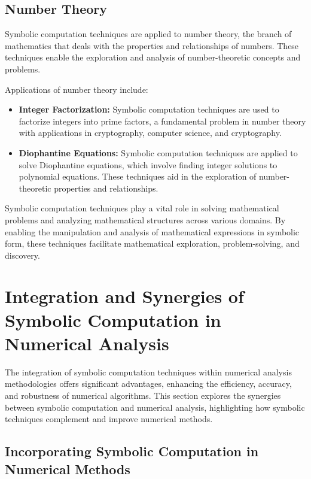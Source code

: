 \subsection{Number Theory}

Symbolic computation techniques are applied to number theory, the branch of mathematics that deals with the properties and relationships of numbers. These techniques enable the exploration and analysis of number-theoretic concepts and problems.

Applications of number theory include:
%
\begin{itemize}
  \item \textbf{Integer Factorization:} Symbolic computation techniques are used to factorize integers into prime factors, a fundamental problem in number theory with applications in cryptography, computer science, and cryptography.
  \item \textbf{Diophantine Equations:} Symbolic computation techniques are applied to solve Diophantine equations, which involve finding integer solutions to polynomial equations. These techniques aid in the exploration of number-theoretic properties and relationships.
\end{itemize}

Symbolic computation techniques play a vital role in solving mathematical problems and analyzing mathematical structures across various domains. By enabling the manipulation and analysis of mathematical expressions in symbolic form, these techniques facilitate mathematical exploration, problem-solving, and discovery.


\section{Integration and Synergies of Symbolic Computation in Numerical Analysis}
\label{chap2:sec:integration}

The integration of symbolic computation techniques within numerical analysis methodologies offers significant advantages, enhancing the efficiency, accuracy, and robustness of numerical algorithms. This section explores the synergies between symbolic computation and numerical analysis, highlighting how symbolic techniques complement and improve numerical methods.

\subsection{Incorporating Symbolic Computation in Numerical Methods}


